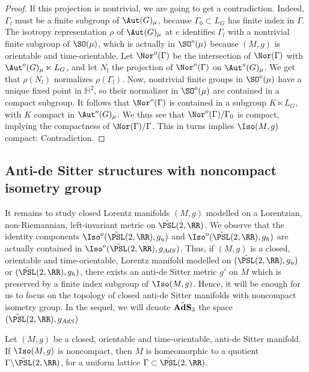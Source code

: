 \begin{proof}
If this projection is nontrivial, we are going to get a contradiction. Indeed, $\Gamma_l$ must be a finite subgroup of $\Aut(G)_{\mu}$, because $\Gamma_0 \subset L_G$ has finite index in $\Gamma$. The isotropy representation $\rho$ of $\Aut(G)_{\mu}$ at $e$ identifies $\Gamma_l$ with a nontrivial finite subgroup of $\SO(\mu)$, which is actually in $\SO^o(\mu)$ because $(M,g)$ is orientable and time-orientable. Let $\Nor^o(\Gamma)$ be the intersection of $\Nor(\Gamma)$ with $\Aut^o(G)_{\mu} \ltimes L_G$, and let $N_l$ the projection of $\Nor^o(\Gamma)$ on $\Aut^o(G)_{\mu}$. We get that $\rho(N_l)$ normalizes $\rho(\Gamma_l)$. Now, nontrivial finite groups in $\SO^o(\mu)$ have a unique fixed point in ${\mathbb H}^2$, so their normalizer in $\SO^o(\mu)$ are contained in a compact subgroup. It follows that $\Nor^o(\Gamma)$ is contained in a subgroup $K \ltimes L_G$, with $K$ compact in $\Aut^o(G)_{\mu}$. We thus see that $\Nor^o(\Gamma)/\Gamma_0$ is compact, implying the compactness of $\Nor(\Gamma)/ \Gamma$. This in turns implies $\Iso(M,g)$ compact: Contradiction.
\end{proof}

\subsection{Anti-de Sitter structures with noncompact isometry group}

It remains to study closed Lorentz manifolds $(M,g)$ modelled on a Lorentzian, non-Riemannian, left-invariant metric on $\tilde{\PSL}(2,\RR)$. We observe that the identity components $\Iso^o(\tilde{\PSL}(2,\RR),g_u)$ and $\Iso^o(\tilde{\PSL}(2,\RR),g_h)$ are actually contained in $\Iso^o(\tilde{\PSL}(2,\RR),g_{AdS})$. Thus, if $(M,g)$ is a closed, orientable and time-orientable, Lorentz manifold modelled on $(\tilde{\PSL}(2,\RR),g_u)$ or $(\tilde{\PSL}(2,\RR),g_h)$, there exists an anti-de Sitter metric $g'$ on $M$ which is preserved by a finite index subgroup of $\Iso(M,g)$. Hence, it will be enough for us to focus on the topology of closed anti-de Sitter manifolds with noncompact isometry group. In the sequel, we will denote $\tilde{\bf AdS}_3$ the space $(\tilde{\PSL}(2,\RR),g_{AdS})$

\begin{prop}\label{prop.topologieads}
Let $(M,g)$ be a closed, orientable and time-orientable, anti-de Sitter manifold. If $\Iso(M,g)$ is noncompact, then $M$ is homeomorphic to a quotient $\Gamma \backslash \tilde{\PSL}(2,\RR)$, for a uniform lattice $\Gamma \subset \tilde{\PSL}(2,\RR)$.
\end{prop}

